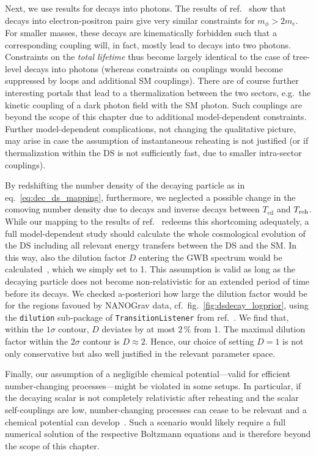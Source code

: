 	Next, we use results for decays into photons. The results of ref.~\cite{Depta:2020zbh} show that decays into electron-positron pairs give very similar constraints for $m_\phi>2 m_e$. For smaller masses, these decays are kinematically forbidden such that a corresponding coupling will, in fact, mostly lead to decays into two photons. Constraints on the \textit{total lifetime} thus become largely identical to the case of tree-level decays into photons (whereas constraints on  couplings would become suppressed by loops and additional SM couplings). There are of course further interesting portals that lead to a thermalization between the two sectors, e.g.~the kinetic coupling of a dark photon field with the \ac{SM} photon. Such couplings are beyond the scope of this chapter due to additional model-dependent constraints.
	Further model-dependent complications, not changing the qualitative picture, may arise in case the assumption of instantaneous reheating is not justified (or if thermalization within the DS is not sufficiently fast, due to smaller intra-sector couplings).
	
	By redshifting the number density of the decaying particle as in eq.~\eqref{eq:dec_ds_mapping}, furthermore, we neglected a possible change in the comoving number density due to decays and inverse decays between $T_\mathrm{cd}$ and $T_{\text{reh}}$. While our mapping to the results of ref.~\cite{Bai:2021ibt} redeems this shortcoming adequately, a full model-dependent study should calculate the whole cosmological evolution of the DS including all relevant energy transfers between the DS and the SM. In this way, also the dilution  factor $D$ entering the \ac{GWB} spectrum would be calculated~\cite{Ertas:2021xeh}, which we simply set to 1. This assumption is valid as long as the decaying particle does not become non-relativistic for an extended period of time before its decays. We checked a-posteriori how large the dilution factor would be for the regions favoued by \ac{NANOGrav} data, cf.~fig.~\ref{fig:dsdecay_logprior}, using the \texttt{dilution} sub-package of \texttt{TransitionListener} from ref.~\cite{Ertas:2021xeh}. We find that, within the $1 \sigma$ contour, $D$ deviates by at most $2 \, \%$ from 1. The maximal dilution factor within the $2  \sigma$ contour is $D \approx 2$. Hence, our choice of setting $D = 1$ is not only conservative but also well justified in the relevant parameter space.
	
	Finally, our assumption of a negligible chemical potential---valid for efficient number-changing processes---might be violated in some setups.  In particular,  if the decaying scalar is not completely relativistic after reheating and the scalar self-couplings are low, number-changing processes can cease to be relevant and a chemical potential can develop~\cite{Bringmann:2020mgx,Hufnagel:2022aiz}. Such a scenario would likely require a full numerical solution of the respective Boltzmann equations and is therefore beyond the scope of this chapter. 
	
